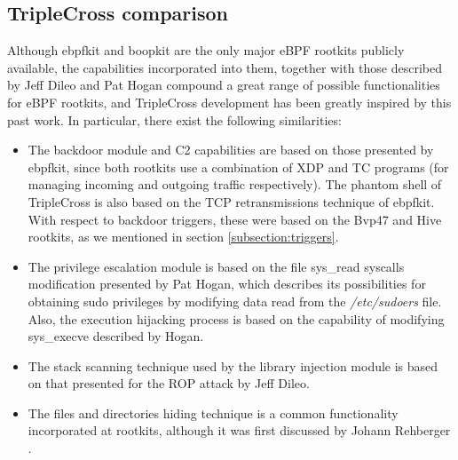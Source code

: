 \subsection{TripleCross comparison}
Although ebpfkit and boopkit are the only major eBPF rootkits publicly
available, the capabilities incorporated into them, together with those
described by Jeff Dileo and Pat Hogan compound a great range of possible
functionalities for eBPF rootkits, and TripleCross development has been
greatly inspired by this past work. In particular, there exist the
following similarities:
\begin{itemize}
\item The backdoor module and C2 capabilities are based on those presented by ebpfkit, since both rootkits use a combination of XDP and TC programs (for managing incoming and outgoing traffic respectively). The phantom shell of TripleCross is also based on the TCP retransmissions technique of ebpfkit. With respect to backdoor triggers, these were based on the Bvp47 and Hive rootkits, as we mentioned in section \ref{subsection:triggers}.
\item The privilege escalation module is based on the file sys\_read syscalls modification presented by Pat Hogan, which describes its possibilities for obtaining sudo privileges by modifying data read from the \textit{/etc/sudoers} file. Also, the execution hijacking process is based on the capability of modifying sys\_execve described by Hogan.
\item The stack scanning technique used by the library injection module is based on that presented for the ROP attack by Jeff Dileo.
\item The files and directories hiding technique is a common functionality incorporated at rootkits, although it was first discussed by Johann Rehberger \cite{embracethered_getdents}.
\end{itemize}

